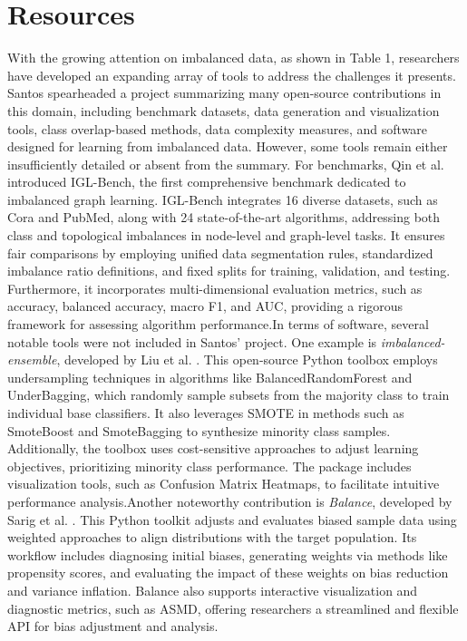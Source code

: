 \section{Resources}
\label{sec:packages}

With the growing attention on imbalanced data, as shown in Table 1, researchers have developed an expanding array of tools to address the challenges it presents. Santos \cite{santos_imbalance_overlap} spearheaded a project summarizing many open-source contributions in this domain, including benchmark datasets, data generation and visualization tools, class overlap-based methods, data complexity measures, and software designed for learning from imbalanced data. However, some tools remain either insufficiently detailed or absent from the summary. For benchmarks, Qin et al. \cite{qin2024iglbench} introduced IGL-Bench, the first comprehensive benchmark dedicated to imbalanced graph learning. IGL-Bench integrates 16 diverse datasets, such as Cora and PubMed, along with 24 state-of-the-art algorithms, addressing both class and topological imbalances in node-level and graph-level tasks. It ensures fair comparisons by employing unified data segmentation rules, standardized imbalance ratio definitions, and fixed splits for training, validation, and testing. Furthermore, it incorporates multi-dimensional evaluation metrics, such as accuracy, balanced accuracy, macro F1, and AUC, providing a rigorous framework for assessing algorithm performance.In terms of software, several notable tools were not included in Santos’ project. One example is \textit{imbalanced-ensemble}, developed by Liu et al. \cite{liu2021imbens}. This open-source Python toolbox employs undersampling techniques in algorithms like BalancedRandomForest and UnderBagging, which randomly sample subsets from the majority class to train individual base classifiers. It also leverages SMOTE in methods such as SmoteBoost and SmoteBagging to synthesize minority class samples. Additionally, the toolbox uses cost-sensitive approaches to adjust learning objectives, prioritizing minority class performance. The package includes visualization tools, such as Confusion Matrix Heatmaps, to facilitate intuitive performance analysis.Another noteworthy contribution is \textit{Balance}, developed by Sarig et al. \cite{sarig2023balance}. This Python toolkit adjusts and evaluates biased sample data using weighted approaches to align distributions with the target population. Its workflow includes diagnosing initial biases, generating weights via methods like propensity scores, and evaluating the impact of these weights on bias reduction and variance inflation. Balance also supports interactive visualization and diagnostic metrics, such as ASMD, offering researchers a streamlined and flexible API for bias adjustment and analysis.
